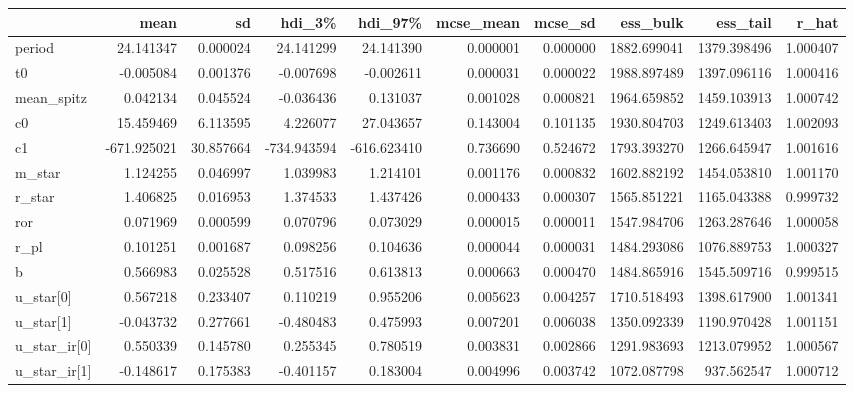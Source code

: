 \begin{tabular}{lrrrrrrrrr}
\toprule
{} &        mean &         sd &      hdi\_3\% &     hdi\_97\% &  mcse\_mean &   mcse\_sd &     ess\_bulk &     ess\_tail &     r\_hat \\
\midrule
period        &   24.141347 &   0.000024 &   24.141299 &   24.141390 &   0.000001 &  0.000000 &  1882.699041 &  1379.398496 &  1.000407 \\
t0            &   -0.005084 &   0.001376 &   -0.007698 &   -0.002611 &   0.000031 &  0.000022 &  1988.897489 &  1397.096116 &  1.000416 \\
mean\_spitz    &    0.042134 &   0.045524 &   -0.036436 &    0.131037 &   0.001028 &  0.000821 &  1964.659852 &  1459.103913 &  1.000742 \\
c0            &   15.459469 &   6.113595 &    4.226077 &   27.043657 &   0.143004 &  0.101135 &  1930.804703 &  1249.613403 &  1.002093 \\
c1            & -671.925021 &  30.857664 & -734.943594 & -616.623410 &   0.736690 &  0.524672 &  1793.393270 &  1266.645947 &  1.001616 \\
m\_star        &    1.124255 &   0.046997 &    1.039983 &    1.214101 &   0.001176 &  0.000832 &  1602.882192 &  1454.053810 &  1.001170 \\
r\_star        &    1.406825 &   0.016953 &    1.374533 &    1.437426 &   0.000433 &  0.000307 &  1565.851221 &  1165.043388 &  0.999732 \\
ror           &    0.071969 &   0.000599 &    0.070796 &    0.073029 &   0.000015 &  0.000011 &  1547.984706 &  1263.287646 &  1.000058 \\
r\_pl          &    0.101251 &   0.001687 &    0.098256 &    0.104636 &   0.000044 &  0.000031 &  1484.293086 &  1076.889753 &  1.000327 \\
b             &    0.566983 &   0.025528 &    0.517516 &    0.613813 &   0.000663 &  0.000470 &  1484.865916 &  1545.509716 &  0.999515 \\
u\_star[0]     &    0.567218 &   0.233407 &    0.110219 &    0.955206 &   0.005623 &  0.004257 &  1710.518493 &  1398.617900 &  1.001341 \\
u\_star[1]     &   -0.043732 &   0.277661 &   -0.480483 &    0.475993 &   0.007201 &  0.006038 &  1350.092339 &  1190.970428 &  1.001151 \\
u\_star\_ir[0]  &    0.550339 &   0.145780 &    0.255345 &    0.780519 &   0.003831 &  0.002866 &  1291.983693 &  1213.079952 &  1.000567 \\
u\_star\_ir[1]  &   -0.148617 &   0.175383 &   -0.401157 &    0.183004 &   0.004996 &  0.003742 &  1072.087798 &   937.562547 &  1.000712 \\

\end{tabular}
